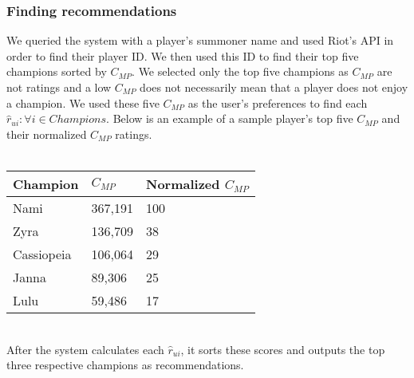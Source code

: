 \documentclass [11pt]{IEEEtran}
\begin{document}
\subsubsection{Finding recommendations}
We queried the system with a player's summoner name and used Riot's API in order to find their player ID. We then used this ID to find their top five champions sorted by $C_{MP}$. We selected only the top five champions as $C_{MP}$ are not ratings and a low $C_{MP}$ does not necessarily mean that a player does not enjoy a champion. We used these five $C_{MP}$ as the user's preferences to find each $\hat{r}_{ui} : \forall i \in Champions$. Below is an example of a sample player's top five $C_{MP}$ and their normalized $C_{MP}$ ratings. \\\\
\begin{tabular}{| l | l | l |}
    \hline
    Champion & $C_{MP}$ & Normalized $C_{MP}$ \\ \hline
    Nami & 367,191 & 100\\ 
    Zyra & 136,709 & 38 \\
    Cassiopeia & 106,064 & 29 \\
    Janna & 89,306 & 25\\
    Lulu & 59,486 & 17\\
    \hline
\end{tabular}
\vspace{.2cm} \\ \noindent
After the system calculates each $\hat{r}_{ui}$, it sorts these scores and outputs the top three respective champions as recommendations. 
\end{document}
